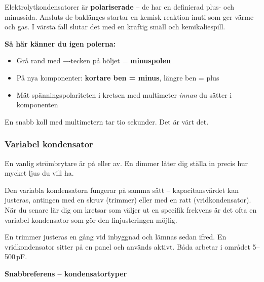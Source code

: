 \documentclass[a4paper,11pt,twoside]{book}
\newcommand{\emoji}[1]{{\emojifont #1}}
\begin{document}
\begin{redbox}[title={\emoji{⚠️} Kritisk polaritet}]
Elektrolytkondensatorer är \textbf{polariserade} -- de har 
en definierad plus- och minussida. Ansluts de baklänges 
startar en kemisk reaktion inuti som ger värme och gas. 
I värsta fall slutar det med en kraftig smäll och 
kemikaliespill.

\medskip
\textbf{Så här känner du igen polerna:}
\begin{itemize}
  \item Grå rand med ${-}$-tecken på höljet = \textbf{minuspolen}
  \item På nya komponenter: \textbf{kortare ben = minus}, längre ben = plus
  \item Mät spänningspolariteten i kretsen med multimeter 
        \emph{innan} du sätter i komponenten
\end{itemize}

\medskip
En snabb koll med multimetern tar tio sekunder. Det är 
värt det.
\end{redbox}

\subsubsection*{Variabel kondensator}

\begin{storybox}[{\emoji{🎚️} Dimmern}]
En vanlig strömbrytare är på eller av. En dimmer låter 
dig ställa in precis hur mycket ljus du vill ha.

Den variabla kondensatorn fungerar på samma sätt -- 
kapacitansvärdet kan justeras, antingen med en skruv 
(trimmer) eller med en ratt (vridkondensator). När du 
senare lär dig om kretsar som väljer ut en specifik 
frekvens är det ofta en variabel kondensator som gör 
den finjusteringen möjlig.
\end{storybox}

En trimmer justeras en gång vid inbyggnad och lämnas 
sedan ifred. En vridkondensator sitter på en panel och 
används aktivt. Båda arbetar i området 5--500\,pF.

\medskip
\noindent\textbf{Snabbreferens -- kondensatortyper}
\end{document}
